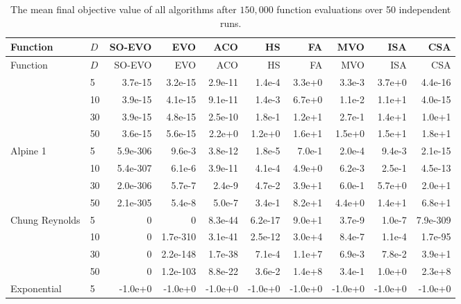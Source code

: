 {\footnotesize\setlength{\tabcolsep}{3pt}\setlength{\LTcapwidth}{\textwidth}\renewcommand{\arraystretch}{0.97}
\begin{longtable}{llrrrrrrrr}
\caption{The mean final objective value of all algorithms after $150{,}000$ function evaluations over 50 independent runs.}\label{tab:fixedfe_full}\\
\toprule
Function & $D$ & SO-EVO & EVO & ACO & HS & FA & MVO & ISA & CSA \\
\midrule
\endfirsthead
\toprule
Function & $D$ & SO-EVO & EVO & ACO & HS & FA & MVO & ISA & CSA \\
\midrule
\endhead
\bottomrule
\endfoot
\multirow{4}{*}{Ackley 1} & 5 & 3.7e{-}15 & 3.2e{-}15 & 2.9e{-}11 & 1.4e{-}4 & 3.3e{+}0 & 3.3e{-}3 & 3.7e{+}0 & 4.4e{-}16 \\*
 & 10 & 3.9e{-}15 & 4.1e{-}15 & 9.1e{-}11 & 1.4e{-}3 & 6.7e{+}0 & 1.1e{-}2 & 1.1e{+}1 & 4.0e{-}15 \\*
 & 30 & 3.9e{-}15 & 4.8e{-}15 & 2.5e{-}10 & 1.8e{-}1 & 1.2e{+}1 & 2.7e{-}1 & 1.4e{+}1 & 1.0e{+}1 \\*
 & 50 & 3.6e{-}15 & 5.6e{-}15 & 2.2e{+}0 & 1.2e{+}0 & 1.6e{+}1 & 1.5e{+}0 & 1.5e{+}1 & 1.8e{+}1 \\
\midrule
\multirow{4}{*}{Alpine 1} & 5 & 5.9e{-}306 & 9.6e{-}3 & 3.8e{-}12 & 1.8e{-}5 & 7.0e{-}1 & 2.0e{-}4 & 9.4e{-}3 & 2.1e{-}15 \\*
 & 10 & 5.4e{-}307 & 6.1e{-}6 & 3.9e{-}11 & 4.1e{-}4 & 4.9e{+}0 & 6.2e{-}3 & 2.5e{-}1 & 4.5e{-}13 \\*
 & 30 & 2.0e{-}306 & 5.7e{-}7 & 2.4e{-}9 & 4.7e{-}2 & 3.9e{+}1 & 6.0e{-}1 & 5.7e{+}0 & 2.0e{+}1 \\*
 & 50 & 2.1e{-}305 & 5.4e{-}8 & 5.0e{-}7 & 3.4e{-}1 & 8.2e{+}1 & 4.4e{+}0 & 1.4e{+}1 & 6.8e{+}1 \\
\midrule
\multirow{4}{*}{Chung Reynolds} & 5 & 0 & 0 & 8.3e{-}44 & 6.2e{-}17 & 9.0e{+}1 & 3.7e{-}9 & 1.0e{-}7 & 7.9e{-}309 \\*
 & 10 & 0 & 1.7e{-}310 & 3.1e{-}41 & 2.5e{-}12 & 3.0e{+}4 & 8.4e{-}7 & 1.1e{-}4 & 1.7e{-}95 \\*
 & 30 & 0 & 2.2e{-}148 & 1.7e{-}38 & 7.1e{-}4 & 1.1e{+}7 & 6.9e{-}3 & 7.8e{-}2 & 3.9e{+}1 \\*
 & 50 & 0 & 1.2e{-}103 & 8.8e{-}22 & 3.6e{-}2 & 1.4e{+}8 & 3.4e{-}1 & 1.0e{+}0 & 2.3e{+}8 \\
\midrule
\multirow{4}{*}{Exponential} & 5 & -1.0e{+}0 & -1.0e{+}0 & -1.0e{+}0 & -1.0e{+}0 & -1.0e{+}0 & -1.0e{+}0 & -1.0e{+}0 & -1.0e{+}0 \\*

\end{longtable}}
